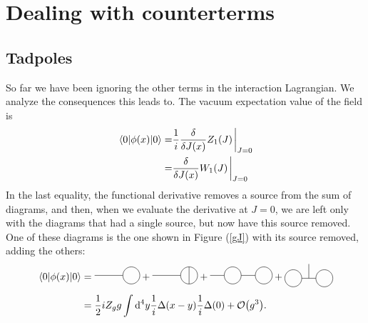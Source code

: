\section{Dealing with counterterms}
\subsection{Tadpoles}
So far we have been ignoring the other terms in the interaction Lagrangian. We analyze the consequences this leads to. The vacuum expectation value of the field is
\begin{equation}
\begin{aligned}
        \vev{\phi(x)}=&\frac{1}{i}\fdv{J(x)}Z_1(J)\eval_{J=0}\\
        =&\fdv{J(x)}W_1(J)\eval_{J=0}
\end{aligned}
\label{1Pcorrelation}
\end{equation}
In the last equality, the functional derivative removes a source from the sum of diagrams, and then, when we evaluate the derivative at $J=0$, we are left only with the diagrams that had a single source, but now have this source removed. One of these diagrams is the one shown in Figure (\ref{gJ}) with its source removed, adding the others:
\begin{equation}
    \begin{aligned}
        \vev{\phi(x)}&=
        \begin{gathered}
        \begin{tikzpicture}
        \draw (0,0) -- (1,0);
        \draw (1.3,0) circle [radius=0.3cm];
        \end{tikzpicture}
        \end{gathered}+
        \begin{gathered}
        \begin{tikzpicture}
        \draw (0,0) -- (1,0);
        \draw (1.3,0) circle [radius=0.3cm];
        \draw (1.3,0.3) -- (1.3,-0.3);
        \end{tikzpicture}
        \end{gathered}+
        \begin{gathered}
        \begin{tikzpicture}
        \draw (0,0) -- (0.5,0);
        \draw (0.8,0) circle [radius=0.3cm];
        \draw (1.1,0) -- (1.6,0);
        \draw (1.9,0) circle [radius=0.3cm];
        \end{tikzpicture}
        \end{gathered}+       
        \begin{gathered}
        \begin{tikzpicture}
        \draw (1.35,0) -- (1.35,0.5);
        \draw (0.8,0) circle [radius=0.3cm];
        \draw (1.1,0) -- (1.6,0);
        \draw (1.9,0) circle [radius=0.3cm];
        \end{tikzpicture}
        \end{gathered}
    \\&=\frac{1}{2}iZ_gg\int\dd^4y\frac{1}{i}\Delta(x-y)\frac{1}{i}\Delta(0)+\order{g^3}.
    \end{aligned}
\end{equation}
